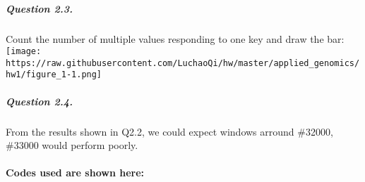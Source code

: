 \documentclass[]{article}
\let\oldparagraph\paragraph
\renewcommand{\paragraph}[1]{\oldparagraph{#1}\mbox{}}
\let\oldsubparagraph\subparagraph
\renewcommand{\subparagraph}[1]{\oldsubparagraph{#1}\mbox{}}
\begin{document}
\subparagraph{Question 2.3.}\label{question-2.3.}

Count the number of multiple values responding to one key and draw the
bar:\\
\texttt{[image: https://raw.githubusercontent.com/LuchaoQi/hw/master/applied\_genomics/hw1/figure\_1-1.png]}

\subparagraph{Question 2.4.}\label{question-2.4.}

From the results shown in Q2.2, we could expect windows arround \#32000,
\#33000 would perform poorly.

\paragraph{Codes used are shown
here:}\label{codes-used-are-shown-here-1}
\end{document}
